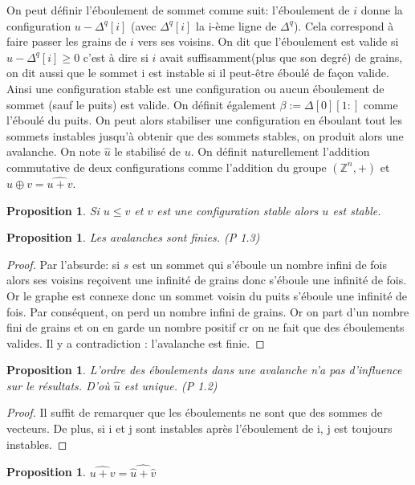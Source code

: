 \documentclass{report}
\newtheorem{property}[theorem]{Proposition}
\newcommand{\stab}[1]{\ensuremath{\widehat{#1}}}
\newcommand{\plus}{\ensuremath{\oplus}}
\begin{document}
On peut définir l'éboulement de sommet comme suit: l'éboulement de $i$ donne la configuration $u - \Delta^q[i]$ (avec $\Delta^q[i]$ la i-ème ligne de $\Delta^q$). Cela correspond à faire passer les grains de $i$ vers ses voisins. On dit que l'éboulement est valide si $u - \Delta^q[i] \geq 0$ c'est à dire si $i$ avait suffisamment(plus que son degré) de grains, on dit aussi que le sommet i est instable si il peut-être éboulé de façon valide. Ainsi une configuration stable est une configuration ou aucun éboulement de sommet (sauf le puits) est valide. On définit également $\beta := \Delta[0][1:]$ comme l'éboulé du puits.
On peut alors stabiliser une configuration en éboulant tout les sommets instables jusqu'à obtenir que des sommets stables, on produit alors une avalanche. On note \stab{u} le stabilisé de $u$.
On définit naturellement l'addition commutative de deux configurations comme l'addition du groupe $(\mathbb{Z}^n, +)$ et $u \plus{} v = \stab{u + v}$.

\begin{property} \label{comp_stab}
Si $u \leq v$ et $v$ est une configuration stable alors $u$ est stable.
\end{property}

\begin{property} 
Les avalanches sont finies. (P 1.3)  \cite{thPoly}
\end{property}
\begin{proof}
Par l'absurde: si $s$ est un sommet qui s'éboule un nombre infini de fois alors ses voisins reçoivent une infinité de grains donc s'éboule une infinité de fois. Or le graphe est connexe donc un sommet voisin du puits s'éboule une infinité de fois. Par conséquent, on perd un nombre infini de grains. Or on part d'un nombre fini de grains et on en garde un nombre positif cr on ne fait que des éboulements valides. Il y a contradiction : l'avalanche est finie. 
\end{proof}

\begin{property}
L'ordre des éboulements dans une avalanche n'a pas d'influence sur le résultats. D'où \stab{u} est unique. (P  1.2) \cite{thPoly}
\end{property}
\begin{proof}
Il suffit de remarquer que les éboulements ne sont que des sommes de vecteurs. De plus, si i et j sont instables après l'éboulement de i, j est toujours instables.
\end{proof}

\begin{property} 
$\stab{u + v} = \stab{\stab{u} + \stab{v}}$ 
\end{property}
\end{document}
